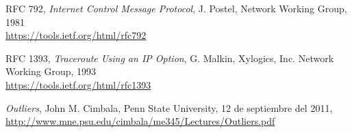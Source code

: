 \begin{thebibliography}{9}

	RFC 792,
	\textit{Internet Control Message Protocol},
	J. Postel,
  Network Working Group,
  1981 \\
	\url{https://tools.ietf.org/html/rfc792}


  RFC 1393,
  \textit{Traceroute Using an IP Option},
  G. Malkin, Xylogics, Inc.
  Network Working Group,
  1993 \\
  \url{https://tools.ietf.org/html/rfc1393}

	\textit{Outliers},
	John M. Cimbala,
	Penn State University,
	12 de septiembre del 2011,
	\url{http://www.mne.psu.edu/cimbala/me345/Lectures/Outliers.pdf}

\end{thebibliography}
